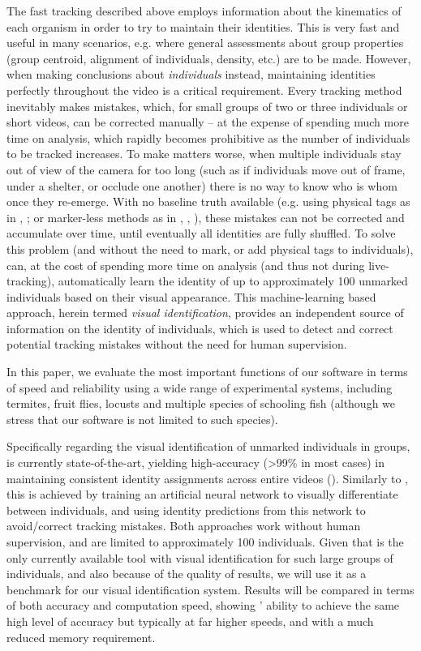 \documentclass[9pt,lineno]{elife}
\newcommand{\idtracker}{\protect\path{ idtracker.ai}}
\newcommand{\TRex}{\protect\path{TRex}}
\begin{document}
The fast tracking described above employs information about the kinematics of each organism in order to try to maintain their identities. This is very fast and useful in many scenarios, e.g. where general assessments about group properties (group centroid, alignment of individuals, density, etc.) are to be made. However, when making conclusions about \textit{individuals} instead, maintaining identities perfectly throughout the video is a critical requirement. Every tracking method inevitably makes mistakes, which, for small groups of two or three individuals or short videos, can be corrected manually -- at the expense of spending much more time on analysis, which rapidly becomes prohibitive as the number of individuals to be tracked increases. To make matters worse, when multiple individuals stay out of view of the camera for too long (such as if individuals move out of frame, under a shelter, or occlude one another) there is no way to know who is whom once they re-emerge. With no baseline truth available (e.g. using physical tags as in \cite{alarcon2018automated}, \cite{nagy2013context}; or marker-less methods as in \cite{idtracker}, \cite{idtrackerai}, \cite{rasch2016closing}), these mistakes can not be corrected and accumulate over time, until eventually all identities are fully shuffled. To solve this problem (and without the need to mark, or add physical tags to individuals), \TRex{} can, at the cost of spending more time on analysis (and thus not during live-tracking), automatically learn the identity of up to approximately 100 unmarked individuals based on their visual appearance. This machine-learning based approach, herein termed \textit{visual identification}, provides an independent source of information on the identity of individuals, which is used to detect and correct potential tracking mistakes without the need for human supervision.

{\color{blue}In this paper, we evaluate the most important functions of our software} in terms of speed and reliability using a wide range of experimental systems, including termites, fruit flies, locusts and multiple species of schooling fish (although we stress that our software is not limited to such species).

Specifically regarding the visual identification of unmarked individuals in groups, \idtracker{} is currently state-of-the-art, yielding high-accuracy (>99\% in most cases) in maintaining consistent identity assignments across entire videos (\cite{idtrackerai}). Similarly to \TRex{}, this is achieved by training an artificial neural network to visually differentiate between individuals, and using identity predictions from this network to avoid/correct tracking mistakes. Both approaches work without human supervision, and are limited to approximately 100 individuals. Given that \idtracker{} is the only currently available tool with visual identification for such large groups of individuals, and also because of the quality of results, we will use it as a benchmark for our visual identification system. Results will be compared in terms of both accuracy and computation speed, showing \TRex{}' ability to achieve the same high level of accuracy but typically at far higher speeds, and with a much reduced memory requirement.
\end{document}
